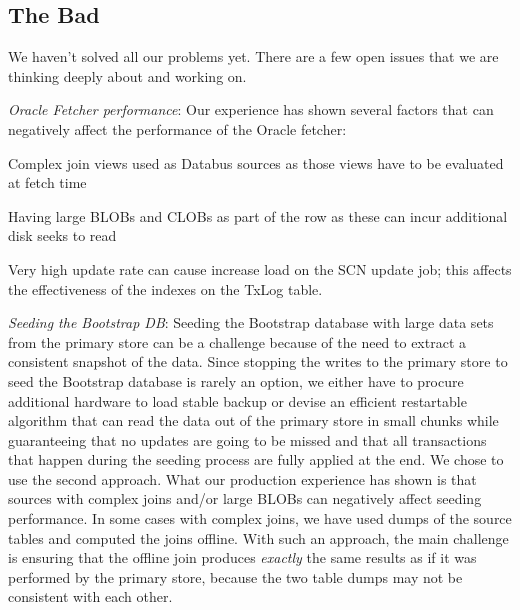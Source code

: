 \subsection{The Bad}
We haven't solved all our problems yet. There are a few open issues that we are thinking deeply about and working on. 
\begin{itemize*}
\item \emph{Oracle Fetcher performance}: Our experience has shown several factors that can negatively affect the performance of the Oracle fetcher:
\begin{itemize*}
\item Complex join views used as Databus sources as those views have to be evaluated at fetch time
\item Having large BLOBs and CLOBs as part of the row as these can incur additional disk seeks to read
\item Very high update rate can cause increase load on the SCN update job; this affects the effectiveness of the indexes on the TxLog table.
\end{itemize*}
\item \emph{Seeding the Bootstrap DB}: Seeding the Bootstrap database with large data sets from the primary store can be a challenge because of the need to extract a consistent snapshot of the data. Since stopping the writes to the primary store to seed the Bootstrap database is rarely an option, we either have to procure additional hardware to load stable backup or devise an efficient restartable algorithm that can read the data out of the primary store in small chunks while guaranteeing that no updates are going to be missed and that all transactions that happen during the seeding process are fully applied at the end. We chose to use the second approach. What our production experience has shown is that sources with complex joins and/or large BLOBs can negatively affect seeding performance. In some cases with complex joins, we have used dumps of the source tables and computed the joins offline. With such an approach, the main challenge is ensuring that the offline join produces \emph{exactly} the same results as if it was performed by the primary store, because the two table dumps may not be consistent with each other.
\end{itemize*}


